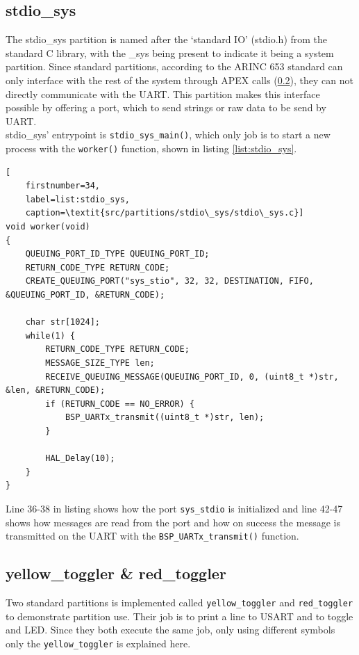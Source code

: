 \subsection{stdio\_sys}
\label{impl:stdio_sys}
The stdio\_sys partition is named after the `standard IO' (stdio.h) from the
standard C library, with the \_sys being present to indicate it being a system
partition. Since standard partitions, according to the ARINC 653 standard can
only interface with the rest of the system through APEX calls (\ref{}), they can
not directly communicate with the UART. This partition makes this interface
possible by offering a port, which to send strings or raw data to be send by
UART.\\

stdio\_sys' entrypoint is \texttt{stdio\_sys\_main()}, which only job is to
start a new process with the \texttt{worker()} function, shown in listing
\ref{list:stdio_sys}.

\begin{minipage}{\linewidth}
\begin{lstlisting}[
	firstnumber=34,
	label=list:stdio_sys,
	caption=\textit{src/partitions/stdio\_sys/stdio\_sys.c}]
void worker(void)
{
    QUEUING_PORT_ID_TYPE QUEUING_PORT_ID;
    RETURN_CODE_TYPE RETURN_CODE;
    CREATE_QUEUING_PORT("sys_stio", 32, 32, DESTINATION, FIFO, &QUEUING_PORT_ID, &RETURN_CODE);

    char str[1024];
    while(1) {
        RETURN_CODE_TYPE RETURN_CODE;
        MESSAGE_SIZE_TYPE len;
        RECEIVE_QUEUING_MESSAGE(QUEUING_PORT_ID, 0, (uint8_t *)str, &len, &RETURN_CODE);
        if (RETURN_CODE == NO_ERROR) {
            BSP_UARTx_transmit((uint8_t *)str, len);
        }

        HAL_Delay(10);
    }
}
\end{lstlisting}
\end{minipage}

Line 36-38 in listing shows how the port \texttt{sys\_stdio} is initialized and line
42-47 shows how messages are read from the port and how on success the message
is transmitted on the UART with the \texttt{BSP\_UARTx\_transmit()} function.


\subsection{yellow\_toggler & red\_toggler}
Two standard partitions is implemented called \texttt{yellow\_toggler} and
\texttt{red\_toggler} to demonstrate partition use. Their job is to print a line
to USART and to toggle and LED. Since they both execute the same job, only using
different symbols only the \texttt{yellow\_toggler} is explained here.\\

